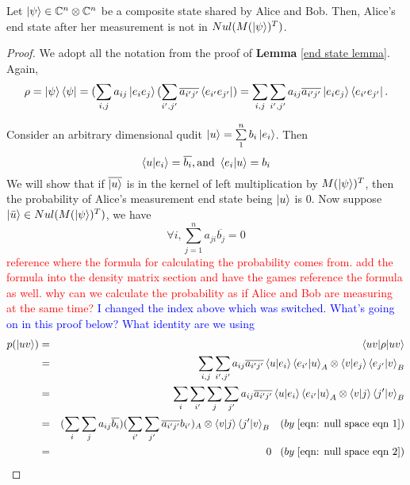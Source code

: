 \begin{prop} \label{null space}
Let $\ket{\psi} \in \mathbb{C}^n \otimes \mathbb{C}^n$ be a composite state shared by Alice and Bob.  Then, Alice's end state after her measurement is not in $Nul(M(\ket{\psi})^T)$.
\end{prop}
\begin{proof}
We adopt all the notation from the proof of {\bf{Lemma}} \ref{end state lemma}.  Again, 
\begin{gather*}
\rho=\ket{\psi}\bra{\psi}=(\sum_{i,j} a_{ij}\ket{e_i e_j}(\sum_{i',j'} \overline{a_{i'j'}}\bra{e_{i'} e_{j'}})=\sum_{i,j} \sum_{i',j'} a_{ij} \overline{a_{i'j'}}\ket{e_i e_j}\bra{e_{i'} e_{j'}}.  
\end{gather*}

Consider an arbitrary dimensional qudit $\ket{u}=\sum\limits_1^n b_i \ket{e_i}$. Then
\begin{equation} \label{eqn: null space eqn 1}
    \braket{u|e_i}=\overline{b_i}, \textrm{and }\braket{e_i|u}=b_i
\end{equation}
We will show that if $\overline{\ket{u}}$ is in the kernel of left multiplication by $M(\ket{\psi})^T$, then the probability of Alice's measurement end state being $\ket{u}$ is $0$. Now suppose
$\ket{\Bar{u}} \in Nul(M(\ket{\psi})^T)$, we have \begin{equation} \label{eqn: null space eqn 2}
    \forall i, \sum_{j=1}^n a_{ji} \overline{b_j}=0
\end{equation}
\textcolor{red}{reference where the formula for calculating the probability comes from. add the formula into the density matrix section and have the games reference the formula as well. why can we calculate the probability as if Alice and Bob are measuring at the same time? }
\textcolor{blue}{I changed the index above which was switched.  What's going on in this proof below?  What identity are we using}
\begin{eqnarray*}
p(\ket{uv})&=&\braket{u v | \rho |u v}\\
&=&\sum_{i,j} \sum_{i',j'} a_{ij} \overline{a_{i'j'}}\braket{u|e_i}\braket{e_{i'}|u}_A \otimes \braket{v|e_j}\braket{e_{j'}|v}_B\\
&=&\sum_i \sum_{i'} \sum_j \sum_{j'}  a_{ij} \overline{a_{i'j'}} \braket{u|e_i}\braket{e_{i'}|u}_A \otimes \braket{v|j}\braket{j'|v}_B\\
&=&(\sum_i \sum_j a_{ij} \overline{b_i})(\sum_{i'} \sum_{j'} \overline{a_{i'j'}} b_{i'})_A \otimes \braket{v|j}\braket{j'|v}_B   \; \; \;  (by \;  \eqref{eqn: null space eqn 1})\\ 
&=& 0 \; \; \; (by \; \eqref{eqn: null space eqn 2})
\end{eqnarray*}






\end{proof}

